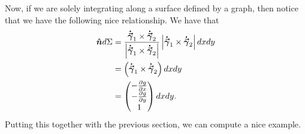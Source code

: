                                      Now, if we are solely integrating along a surface defined by a graph, then notice that we have the following nice relationship.  We have that
                                     \begin{align*}
                                     \boldsymbol{\hat{n}} d\Sigma &= \frac{\boldsymbol{\dot{\vec{\gamma}}}_1\times \boldsymbol{\dot{\vec{\gamma}}}_2}{\left|\boldsymbol{\dot{\vec{\gamma}}}_1 \times \boldsymbol{\dot{\vec{\gamma}}}_2\right|} \left|\boldsymbol{\dot{\vec{\gamma}}}_1 \times \boldsymbol{\dot{\vec{\gamma}}}_2 \right| dxdy\\
                                     &= \left(\boldsymbol{\dot{\vec{\gamma}}}_1 \times \boldsymbol{\dot{\vec{\gamma}}}_2\right)dxdy\\
                                     &= \begin{pmatrix} -\frac{\partial g}{\partial x} \\ -\frac{\partial g}{\partial y} \\ 1 \end{pmatrix} dx dy.
                                     \end{align*}
                                      Putting this together with the previous section, we can compute a nice example.

